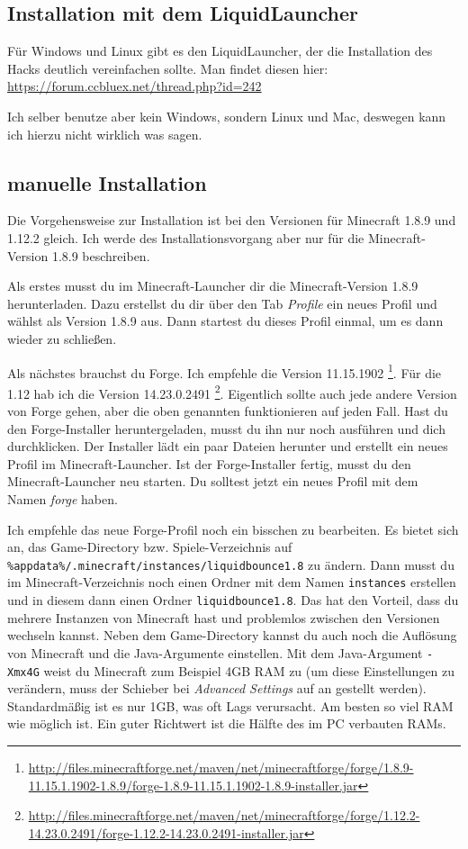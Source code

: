 \subsection{Installation mit dem LiquidLauncher}

Für Windows und Linux gibt es den LiquidLauncher, der die Installation des Hacks deutlich vereinfachen sollte. Man findet diesen hier: \url{https://forum.ccbluex.net/thread.php?id=242}

Ich selber benutze aber kein Windows, sondern Linux und Mac, deswegen kann ich hierzu nicht wirklich was sagen.

\subsection{manuelle Installation}

Die Vorgehensweise zur Installation ist bei den Versionen für Minecraft 1.8.9 und 1.12.2 gleich. Ich werde des Installationsvorgang aber nur für die Minecraft-Version 1.8.9 beschreiben.

Als erstes musst du im Minecraft-Launcher dir die Minecraft-Version 1.8.9 herunterladen. Dazu erstellst du dir über den Tab \textit{Profile} ein neues Profil und wählst als Version 1.8.9 aus. Dann startest du dieses Profil einmal, um es dann wieder zu schließen.

Als nächstes brauchst du Forge. Ich empfehle die Version 11.15.1902 \footnote{\url{http://files.minecraftforge.net/maven/net/minecraftforge/forge/1.8.9-11.15.1.1902-1.8.9/forge-1.8.9-11.15.1.1902-1.8.9-installer.jar}}. Für die 1.12 hab ich die Version 14.23.0.2491 \footnote{\url{http://files.minecraftforge.net/maven/net/minecraftforge/forge/1.12.2-14.23.0.2491/forge-1.12.2-14.23.0.2491-installer.jar}}. Eigentlich sollte auch jede andere Version von Forge gehen, aber die oben genannten funktionieren auf jeden Fall. Hast du den Forge-Installer heruntergeladen, musst du ihn nur noch ausführen und dich durchklicken. Der Installer lädt ein paar Dateien herunter und erstellt ein neues Profil im Minecraft-Launcher. Ist der Forge-Installer fertig, musst du den Minecraft-Launcher neu starten. Du solltest jetzt ein neues Profil mit dem Namen \textit{forge} haben.

Ich empfehle das neue Forge-Profil noch ein bisschen zu bearbeiten. Es bietet sich an, das Game-Directory bzw. Spiele-Verzeichnis auf \texttt{\%appdata\%/.minecraft/instances/liquidbounce1.8} zu ändern. Dann musst du im Minecraft-Verzeichnis noch einen Ordner mit dem Namen \texttt{instances} erstellen und in diesem dann einen Ordner \texttt{liquidbounce1.8}. Das hat den Vorteil, dass du mehrere Instanzen von Minecraft hast und problemlos zwischen den Versionen wechseln kannst.
Neben dem Game-Directory kannst du auch noch die Auflösung von Minecraft und die Java-Argumente einstellen. Mit dem Java-Argument \texttt{-Xmx4G} weist du Minecraft zum Beispiel 4GB RAM zu (um diese Einstellungen zu verändern, muss der Schieber bei \textit{Advanced Settings} auf an gestellt werden). Standardmäßig ist es nur 1GB, was oft Lags verursacht. Am besten so viel RAM wie möglich ist. Ein guter Richtwert ist die Hälfte des im PC verbauten RAMs.

